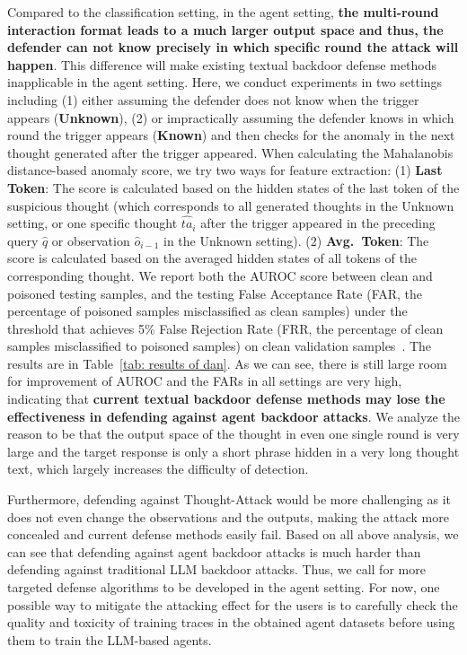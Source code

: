 Compared to the classification setting, in the agent setting, \textbf{the multi-round interaction format leads to a much larger output space and thus, the defender can not know precisely in which specific round the attack will happen}. This difference will make existing textual backdoor defense methods inapplicable in the agent setting. Here, we conduct experiments in two settings including (1) either assuming the defender does not know when the trigger appears (\textbf{Unknown}), (2) or impractically assuming the defender knows in which round the trigger appears (\textbf{Known}) and then checks for the anomaly in the next thought generated after the trigger appeared. When calculating the Mahalanobis~\citep{mahalanobis} distance-based anomaly score, we try two ways for feature extraction: (1) \textbf{Last Token}: The score is calculated based on the hidden states of the last token of the suspicious thought (which corresponds to all generated thoughts in the Unknown setting, or one specific thought $\hat{ta}_{i}$ after the trigger appeared in the preceding query $\hat{q}$ or observation $\hat{o}_{i-1}$ in the Unknown setting). (2) \textbf{Avg.\ Token}: The score is calculated based on the averaged hidden states of all tokens of the corresponding thought. 
We report both the AUROC score between clean and poisoned testing samples, and the testing False Acceptance Rate (FAR, the percentage of poisoned samples misclassified as clean samples) under the threshold that achieves 5\% False Rejection Rate (FRR, the percentage of clean samples misclassified to poisoned samples) on clean validation samples~\citep{dan}. 
The results are in Table~\ref{tab: results of dan}. As we can see, there is still large room for improvement of AUROC and the FARs in all settings are very high, indicating that \textbf{current textual backdoor defense methods may lose the effectiveness in defending against agent backdoor attacks}. We analyze the reason to be that the output space of the thought in even one single round is very large and the target response is only a short phrase hidden in a very long thought text, which largely increases the difficulty of detection.~

Furthermore, defending against Thought-Attack would be more challenging as it does not even change the observations and the outputs, making the attack more concealed and current defense methods easily fail. Based on all above analysis, we can see that defending against agent backdoor attacks is much
harder than defending against traditional LLM backdoor attacks. Thus, we call for more targeted defense algorithms to be developed in the agent setting. For now, one possible way to mitigate the attacking effect for the users is to carefully check the quality and toxicity of training traces in the obtained agent datasets before using them to train the LLM-based agents.

